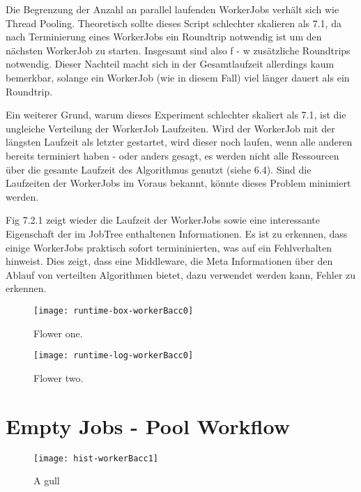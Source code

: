 Die Begrenzung der Anzahl an parallel laufenden WorkerJobs verhält sich wie Thread Pooling.
Theoretisch sollte dieses Script schlechter skalieren als 7.1, da nach Terminierung eines WorkerJobs ein Roundtrip notwendig ist um den nächsten WorkerJob zu starten.
Insgesamt sind also f - w zusätzliche Roundtrips notwendig.
Dieser Nachteil macht sich in der Gesamtlaufzeit allerdings kaum bemerkbar, solange ein WorkerJob (wie in diesem Fall) viel länger dauert als ein Roundtrip.

Ein weiterer Grund, warum dieses Experiment schlechter skaliert als 7.1, ist die ungleiche Verteilung der WorkerJob Laufzeiten.
Wird der WorkerJob mit der längsten Laufzeit als letzter gestartet, wird dieser noch laufen, wenn alle anderen bereits terminiert haben
- oder anders gesagt, es werden nicht alle Ressourcen über die gesamte Laufzeit des Algorithmus genutzt (siehe 6.4).
Sind die Laufzeiten der WorkerJobs im Voraus bekannt, könnte dieses Problem minimiert werden.

Fig 7.2.1 zeigt wieder die Laufzeit der WorkerJobs sowie eine interessante Eigenschaft der im  JobTree enthaltenen Informationen.
Es ist zu erkennen, dass einige WorkerJobs praktisch sofort termininierten, was auf ein Fehlverhalten hinweist.
Dies zeigt, dass eine Middleware, die Meta Informationen über den Ablauf von verteilten Algorithmen bietet, dazu verwendet werden kann, Fehler zu erkennen.

\vspace{25mm}

\begin{figure}[H]
  \centering
  \begin{minipage}[b]{0.45\textwidth}
    \texttt{[image: runtime-box-workerBacc0]}
    \caption{Flower one.}
  \end{minipage}
  \hfill
  \begin{minipage}[b]{0.45\textwidth}
    \texttt{[image: runtime-log-workerBacc0]}
    \caption{Flower two.}
  \end{minipage}
\end{figure}






\clearpage
\section{Empty Jobs - Pool Workflow}

\begin{wrapfigure}{r}{0.42\textwidth}
  \vspace{-20pt}
  \begin{center}
    \texttt{[image: hist-workerBacc1]}
  \end{center}
  \caption{A gull}
\end{wrapfigure}

